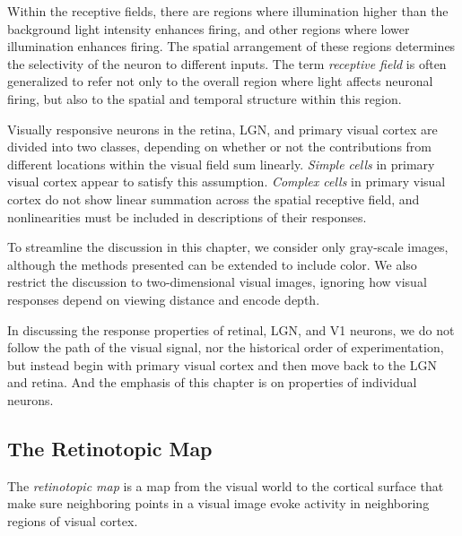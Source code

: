 \begin{rem}
  Within the receptive fields, there are regions where illumination higher than the background light intensity enhances firing, and other regions where lower illumination enhances firing. The spatial arrangement of these regions determines the selectivity of the neuron to different inputs. The term \emph{receptive field} is often generalized to refer not only to the overall region where light affects neuronal firing, but also to the spatial and temporal structure within this region.
\end{rem}

\begin{defn}
  \label{simpleComplexCells}
  Visually responsive neurons in the retina, LGN, and primary visual cortex are divided into two classes, depending on whether or not the contributions from different locations within the visual field sum linearly. \emph{Simple cells} in primary visual cortex appear to satisfy this assumption. \emph{Complex cells} in primary visual cortex do not show linear summation across the spatial receptive field, and nonlinearities must be included in descriptions of their responses.
\end{defn}

\begin{asm}
  \label{asm:light}
  To streamline the discussion in this chapter, we consider only gray-scale images, although the methods presented can be extended to include color. We also restrict the discussion to two-dimensional visual images, ignoring how visual responses depend on viewing distance and encode depth.
\end{asm}

\begin{rem}
  In discussing the response properties of retinal, LGN, and V1 neurons, we do not follow the path of the visual signal, nor the historical order of experimentation, but instead begin with primary visual cortex and then move back to the LGN and retina. And the emphasis of this chapter is on properties of individual neurons.
\end{rem}

\subsection{The Retinotopic Map}
\label{sec:retinotopicMap}
\begin{defn}
  \label{def:retinotopicMap}
  The \emph{retinotopic map} is a map from the visual world to the cortical surface that make sure neighboring points in a visual image evoke activity in neighboring regions of visual cortex. 
\end{defn}

